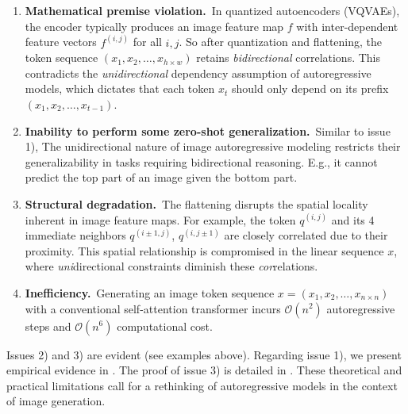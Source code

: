 \begin{enumerate}[label=\arabic*),topsep=1pt,itemsep=2pt,leftmargin=20pt]
\item \textbf{Mathematical premise violation.}\, In quantized autoencoders (VQVAEs), the encoder typically produces an image feature map $f$ with inter-dependent feature vectors $f^{(i,j)}$ for all $i,j$.
So after quantization and flattening, the token sequence $(x_1, x_2, \dots, x_{h\times w})$ retains \textit{bidirectional} correlations.
This contradicts the \textit{unidirectional} dependency assumption of autoregressive models, which dictates that each token $x_t$ should only depend on its prefix $(x_1, x_2, \dots, x_{t-1})$.

\item \textbf{Inability to perform some zero-shot generalization.}\, Similar to issue 1), The unidirectional nature of image autoregressive modeling restricts their generalizability in tasks requiring bidirectional reasoning. E.g., it cannot predict the top part of an image given the bottom part.

\item \textbf{Structural degradation.}\, The flattening disrupts the spatial locality inherent in image feature maps. For example, the token $q^{(i,j)}$ and its 4 immediate neighbors $q^{(i\pm 1,j)}$, $q^{(i,j\pm 1)}$ are closely correlated due to their proximity.
This spatial relationship is compromised in the linear sequence $x$, where \textit{uni}directional constraints diminish these \textit{cor}relations.

\item \textbf{Inefficiency.}\, Generating an image token sequence $x = (x_1, x_2, \dots, x_{n\times n})$ with a conventional self-attention transformer incurs $\mathcal{O}(n^2)$ autoregressive steps and $\mathcal{O}(n^6)$ computational cost.
\end{enumerate}

Issues 2) and 3) are evident (see examples above).
Regarding issue 1), we present empirical evidence in .
The proof of issue 3) is detailed in .
These theoretical and practical limitations call for a rethinking of autoregressive models in the context of image generation.


